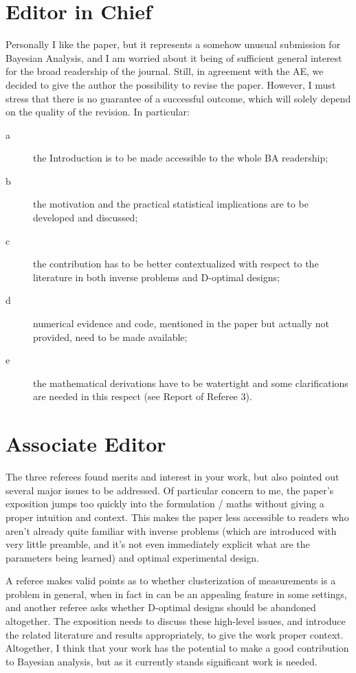 \documentclass{amsart}
\begin{document}
\section{Editor in Chief}
Personally I like the paper, but it represents a somehow unusual
submission for Bayesian Analysis, and I am worried about it being of
sufficient general interest for the broad readership of the
journal. Still, in agreement with the AE, we decided to give the
author the possibility to revise the paper. However, I must stress
that there is no guarantee of a successful outcome, which will solely
depend on the quality of the revision. In particular:

\begin{description}
  \item[a] the Introduction is to be made accessible to the whole BA
    readership;
  \item[b] the motivation and the practical statistical implications are to be
    developed and discussed;
  \item[c] the contribution has to be better contextualized with
    respect to the literature in both inverse problems and D-optimal
    designs;
  \item[d] numerical evidence and code, mentioned in the paper
    but actually not provided, need to be made available;
  \item[e] the mathematical derivations have to be watertight and some
    clarifications are needed in this respect (see Report of Referee
    3).

\end{description}


\section{Associate Editor}
The three referees found merits and interest in your work, but also
pointed out several major issues to be addressed. Of particular
concern to me, the paper's exposition jumps too quickly into the
formulation / maths without giving a proper intuition and
context. This makes the paper less accessible to readers who aren't
already quite familiar with inverse problems (which are introduced
with very little preamble, and it's not even immediately explicit what
are the parameters being learned) and optimal experimental design.

A referee makes valid points as to whether clusterization of
measurements is a problem in general, when in fact in can be an
appealing feature in some settings, and another referee asks whether
D-optimal designs should be abandoned altogether. The exposition needs
to discuss these high-level issues, and introduce the related
literature and results appropriately, to give the work proper
context. Altogether, I think that your work has the potential to make
a good contribution to Bayesian analysis, but as it currently stands
significant work is needed.
\end{document}
